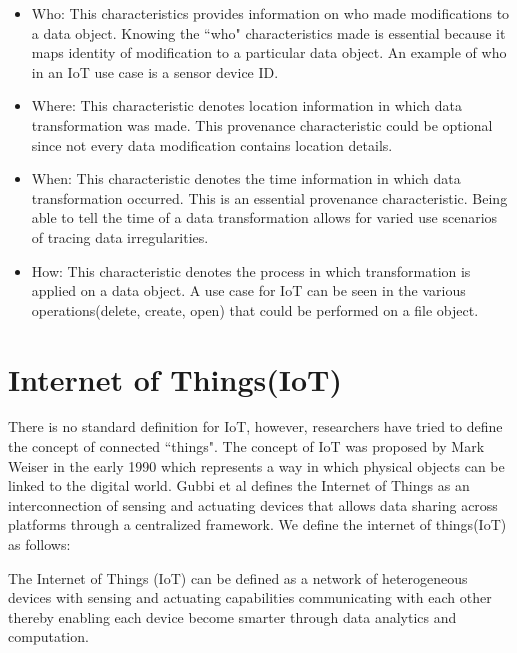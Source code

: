 \begin{itemize}

\item Who: This characteristics provides information on who made modifications to a data object. Knowing the ``who" characteristics made is essential because it maps identity of modification to a particular data object. An example of who in an IoT use case is a sensor device ID.

\item Where: This characteristic denotes location information in which data transformation was made. This provenance characteristic could be optional since not every data modification contains location details.

\item When: This characteristic denotes the time information in which data transformation occurred. This is an essential provenance characteristic. Being able to tell the time of a data transformation allows for varied use scenarios of tracing data irregularities.

\item How: This characteristic denotes the process in which transformation is applied on a data object. A use case for IoT can be seen in the various operations(delete, create, open) that could be performed on a file object.

\end{itemize}


 
\section{Internet of Things(IoT)}
There is no standard definition for IoT, however, researchers have tried to define the concept of connected ``things". The concept of IoT was proposed by Mark Weiser in the early 1990 \cite{Mattern} which represents a way in which physical objects can be linked to the digital world. Gubbi et al \cite{park_provenance-based_2012} defines the Internet of Things as  an interconnection of sensing and actuating devices that allows data sharing across platforms through a centralized framework. We define the internet of things(IoT) as follows:

\begin{definition}
The Internet of Things (IoT) can be defined as a network of heterogeneous devices with sensing and actuating capabilities communicating with each other thereby enabling each device become smarter through data analytics and computation. 

\end{definition}

